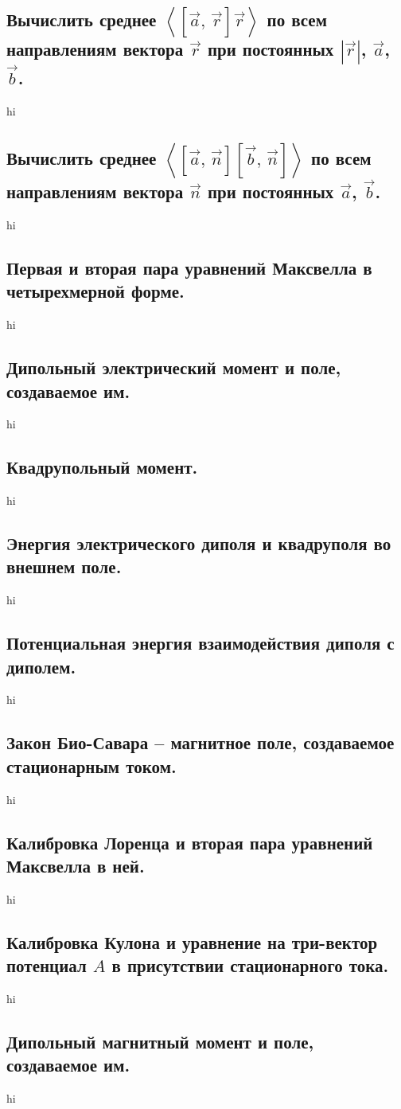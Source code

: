 \documentclass[a4paper,12pt]{article}
\begin{document}
\subsection{Вычислить среднее $\left<\left[ \vec{a},\,\vec{r} \right] \vec{r}
\right>$ по всем направлениям вектора $\vec{r}$ при постоянных  $\left| 
\vec{r}\right| $, $\vec{a}$, $\vec{b}$.}
hi
\subsection{Вычислить среднее $\left<\left[ \vec{a},\,\vec{n} \right]
\left[ \vec{b},\,\vec{n} \right]
\right>$ по всем направлениям вектора $\vec{n}$ при постоянных 
$\vec{a}$, $\vec{b}$.}
hi
\subsection{Первая и вторая пара уравнений Максвелла в четырехмерной форме.}
hi
\subsection{Дипольный электрический момент и поле, создаваемое им.}
hi
\subsection{Квадрупольный момент.}
hi
\subsection{Энергия электрического диполя и квадруполя во внешнем поле.}
hi
\subsection{Потенциальная энергия взаимодействия диполя с диполем.}
hi
\subsection{Закон Био-Савара – магнитное поле, создаваемое стационарным током.}
hi
\subsection{Калибровка Лоренца и вторая пара уравнений Максвелла в ней.}
hi
\subsection{Калибровка Кулона и уравнение на три-вектор потенциал $A$ в
присутствии стационарного тока.}
hi
\subsection{Дипольный магнитный момент и поле, создаваемое им.}
hi
\end{document}
